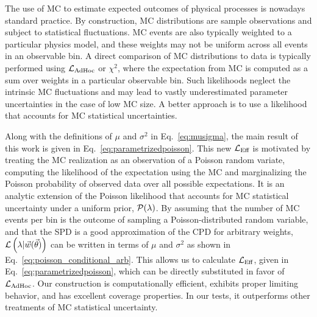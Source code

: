The use of MC to estimate expected outcomes of physical processes is nowadays standard practice.
By construction, MC distributions are sample observations and subject to statistical fluctuations.
MC events are also typically weighted to a particular physics model, and these weights may not be uniform across all events in an observable bin.
A direct comparison of MC distributions to data is typically performed using $\mathcal{L}_{\textmd{AdHoc}}$ or $\chi^2$, where the expectation from MC is computed as a sum over weights in a particular observable bin.
Such likelihoods neglect the intrinsic MC fluctuations and may lead to vastly underestimated parameter uncertainties in the case of low MC size.
A better approach is to use a likelihood that accounts for MC statistical uncertainties.

Along with the definitions of $\mu$ and $\sigma^2$ in Eq.~\eqref{eq:musigma}, the main result of this work is given in Eq.~\eqref{eq:parametrizedpoisson}.
This new $\mathcal{L}_\textmd{Eff}$ is motivated by treating the MC realization as an observation of a Poisson random variate, computing the likelihood of the expectation using the MC and marginalizing the Poisson probability of observed data over all possible expectations.
It is an analytic extension of the Poisson likelihood that accounts for MC statistical uncertainty under a uniform prior, $\mathcal{P}(\lambda)$.
By assuming that the number of MC events per bin is the outcome of sampling a Poisson-distributed random variable, and that the SPD is a good approximation of the CPD for arbitrary weights, $\mathcal{L} \left(\lambda|\vec{w}(\vec{\theta})\right)$ can be written in terms of $\mu$ and $\sigma^2$ as shown in Eq.~\eqref{eq:poisson_conditional_arb}.
This allows us to calculate $\mathcal{L}_\textmd{Eff}$, given in Eq.~\eqref{eq:parametrizedpoisson}, which can be directly substituted in favor of $\mathcal{L}_{\textmd{AdHoc}}$.
Our construction is computationally efficient, exhibits proper limiting behavior, and has excellent coverage properties.
In our tests, it outperforms other treatments of MC statistical uncertainty.
